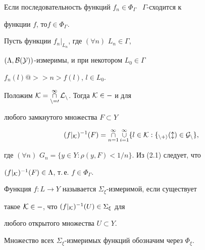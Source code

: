  


\begin{lems} 


Если последовательность функций $f_n\in\Phi_\Gamma$ \ $\Gamma$-сходится к 


функции $f$, то\linebreak $f\in\Phi_\Gamma$. 


\end{lems} 


 


\begin{pf} 


Пусть функции $f_n|_{L_n}$, где $(\forall n)$ $L_n\in\Gamma$, 


$(\Lambda,\cal B(Y))$-измеримы, и при некотором $L_0\in\Gamma$ \ 


$f_n(l)@>>n>f(l)$, $l\in L_0$. 


Положим $\cal K=\mathop{\cap}\limits^\infty_{n=0}L_n$. Тогда $\cal K\in\Gamma$ и для 


любого замкнутого множества $F\subset Y$ 


\begin{equation} 


(f|_{\cal K})^{-1}(F)=\mycap^\infty_{n=1}\mycup^\infty_{i=1} 


\{l\in\cal K:f_{n+i}(l)\in G_n\}, 


\end{equation} 


где $(\forall n)$ $G_n=\{y\in Y:\rho(y,F)<1/n\}$. Из (2.1) следует, что 


$(f|_{\cal K})^{-1}(F)\in\Lambda$, т.\,е. $f\in\Phi_\Gamma$. 


\end{pf} 


 


\begin{defns} 


Функция $f:L\to Y$ называется $\Sigma_\xi$-измеримой, если существует 


такое $\cal K\in\Gamma$, что $(f|_{\cal K})^{-1}(U)\in\Sigma_\xi$ для 


любого открытого множества $U\subset Y$. 


\end{defns} 


 


Множество всех $\Sigma_\xi$-измеримых функций обозначим через $\Phi_\xi$. 


